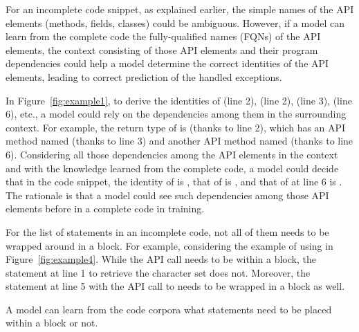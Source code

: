For an incomplete code snippet, as explained earlier, the simple names
of the API elements (methods, fields, classes) could be ambiguous.
However, if a model can learn from the complete code the
fully-qualified names (FQNs) of the API elements, the context
consisting of those API elements and their program dependencies
could help a model determine the correct identities of the API
elements, leading to correct prediction of the handled exceptions.



In Figure~\ref{fig:example1}, to derive the identities of
 (line 2),  (line 2),
 (line 3),  (line 6), etc., a model
could rely on the dependencies among them in the surrounding context.
For example, the return type of  is
 (thanks to line 2), which has an API method named
 (thanks to line 3) and another API method named
 (thanks to line 6). Considering all those dependencies among
the API elements in the context and with the knowledge learned from
the complete code, a model could decide that in the code snippet, the identity of
 is , that of
 is
, and that of 
 at line 6 is
. The rationale is that a
model could see such dependencies among those API elements before in
a complete code in training.





For the list of statements in an incomplete code, not all of them
needs to be wrapped around in a  block. For example,
considering the example of using  in
Figure~\ref{fig:example4}. While the API call
 needs to be within a
 block, the statement at line 1 to retrieve the
character set does not. Moreover, the statement at line 5 with the API
call to  needs to be wrapped in a 
block as well.






\begin{Observation} 
\label{ob5}
  A model can learn from the code corpora what statements need to be placed
  within a  block or not.
\end{Observation}
